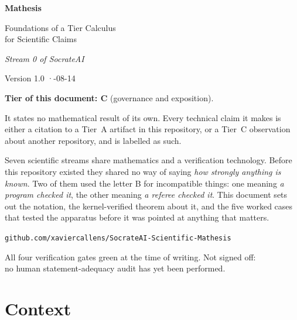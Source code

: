 \documentclass[11pt,a4paper]{article}
\begin{document}
\begin{titlepage}
\centering
\vspace*{2.5cm}
{\Huge\bfseries\color{mathesisink} Mathesis\par}
\vspace{0.8em}
{\LARGE Foundations of a Tier Calculus\\[0.3em] for Scientific Claims\par}
\vspace{2.2em}
{\large\itshape Stream 0 of SocrateAI\par}
\vspace{0.6em}
{\large Version 1.0 \quad·-08-14\par}
\vspace{3.2cm}

\begin{minipage}{0.82\textwidth}
\small
\textbf{Tier of this document: C} (governance and exposition).

It states no mathematical result of its own. Every technical claim it makes is
either a citation to a Tier~A artifact in this repository, or a Tier~C
observation about another repository, and is labelled as such.

\vspace{1em}

Seven scientific streams share mathematics and a verification technology. Before
this repository existed they shared no way of saying \emph{how strongly anything
is known}. Two of them used the letter \textsf{B} for incompatible things: one
meaning \emph{a program checked it}, the other meaning \emph{a referee checked
it}. This document sets out the notation, the kernel-verified theorem about it,
and the five worked cases that tested the apparatus before it was pointed at
anything that matters.
\end{minipage}

\vfill
{\footnotesize\color{rulegray}
\texttt{github.com/xaviercallens/SocrateAI-Scientific-Mathesis}\par
\vspace{0.4em}
All four verification gates green at the time of writing. Not signed off:\\
no human statement-adequacy audit has yet been performed.\par}
\end{titlepage}

\tableofcontents
\newpage

\section{Context}
\end{document}
